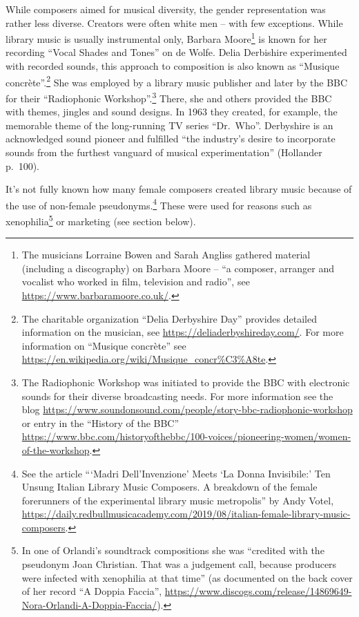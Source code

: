 \documentclass[a4paper,
fontsize=11pt,
oneside,
numbers=noperiodatend,
parskip=half-,
bibliography=totoc,
final
]{scrartcl}
\begin{document}
While composers aimed for musical diversity, the gender representation
was rather less diverse. Creators were often white men -- with few
exceptions. While library music is usually instrumental only, Barbara
Moore\footnote{The musicians Lorraine Bowen and Sarah Angliss gathered
  material (including a discography) on Barbara Moore -- \enquote{a
  composer, arranger and vocalist who worked in film, television and
  radio}, see \url{https://www.barbaramoore.co.uk/}.} is known for her
recording \enquote{Vocal Shades and Tones} on de Wolfe. Delia Derbishire
experimented with recorded sounds, this approach to composition is also
known as \enquote{Musique concrète}.\footnote{The charitable
  organization \enquote{Delia Derbyshire Day} provides detailed
  information on the musician, see
  \url{https://deliaderbyshireday.com/}. For more information on
  \enquote{Musique concrète} see
  \url{https://en.wikipedia.org/wiki/Musique_concr\%C3\%A8te}.} She was
employed by a library music publisher and later by the BBC for their
\enquote{Radiophonic Workshop}.\footnote{The Radiophonic Workshop was
  initiated to provide the BBC with electronic sounds for their diverse
  broadcasting needs. For more information see the blog
  \url{https://www.soundonsound.com/people/story-bbc-radiophonic-workshop}
  or entry in the \enquote{History of the BBC}
  \url{https://www.bbc.com/historyofthebbc/100-voices/pioneering-women/women-of-the-workshop}.}
There, she and others provided the BBC with themes, jingles and sound
designs. In 1963 they created, for example, the memorable theme of the
long-running TV series \enquote{Dr.~Who}. Derbyshire is an acknowledged
sound pioneer and fulfilled \enquote{the industry's desire to
incorporate sounds from the furthest vanguard of musical
experimentation} (Hollander p.~100).

It's not fully known how many female composers created library music
because of the use of non-female pseudonyms.\footnote{See the article
  \enquote{\enquote*{Madri Dell'Invenzione} Meets \enquote*{La Donna
  Invisibile:} Ten Unsung Italian Library Music Composers. A breakdown
  of the female forerunners of the experimental library music
  metropolis} by Andy Votel,
  \url{https://daily.redbullmusicacademy.com/2019/08/italian-female-library-music-composers}.}
These were used for reasons such as xenophilia\footnote{In one of
  Orlandi's soundtrack compositions she was \enquote{credited with the
  pseudonym Joan Christian. That was a judgement call, because producers
  were infected with xenophilia at that time} (as documented on the back
  cover of her record \enquote{A Doppia Faccia},
  \url{https://www.discogs.com/release/14869649-Nora-Orlandi-A-Doppia-Faccia/}).}
or marketing (see section below).
\end{document}
